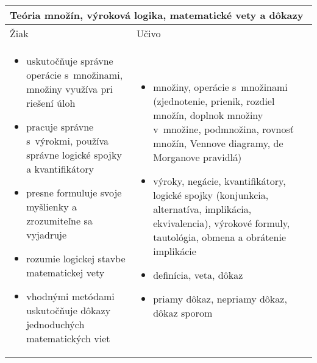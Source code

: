 \noindent \begin{tabularx}{\textwidth} { XX }
  \toprule
  \multicolumn{2}{p{\textwidth}}{Teória množín, výroková logika, matematické vety a dôkazy} \\ \midrule
  Žiak & Učivo \\* \vspace{-10pt}
  \begin{itemize}
    \item uskutočňuje správne operácie s~množinami, množiny využíva pri riešení úloh
    \item pracuje správne s~výrokmi, používa správne logické spojky a kvantifikátory
    \item presne formuluje svoje myšlienky a zrozumiteľne sa vyjadruje
    \item rozumie logickej stavbe matematickej vety
    \item vhodnými metódami uskutočňuje dôkazy jednoduchých matematických viet
  \end{itemize} & \vspace{-10pt}
  \begin{itemize}
    \item množiny, operácie s~množinami (zjednotenie, prienik, rozdiel množín, doplnok množiny v~množine, podmnožina, rovnosť množín, Vennove diagramy, de Morganove pravidlá)
    \item výroky, negácie, kvantifikátory, logické spojky (konjunkcia, alternatíva, implikácia, ekvivalencia), výrokové formuly, tautológia, obmena a obrátenie implikácie
    \item definícia, veta, dôkaz
    \item priamy dôkaz, nepriamy dôkaz, dôkaz sporom
  \end{itemize}
\end{tabularx}
